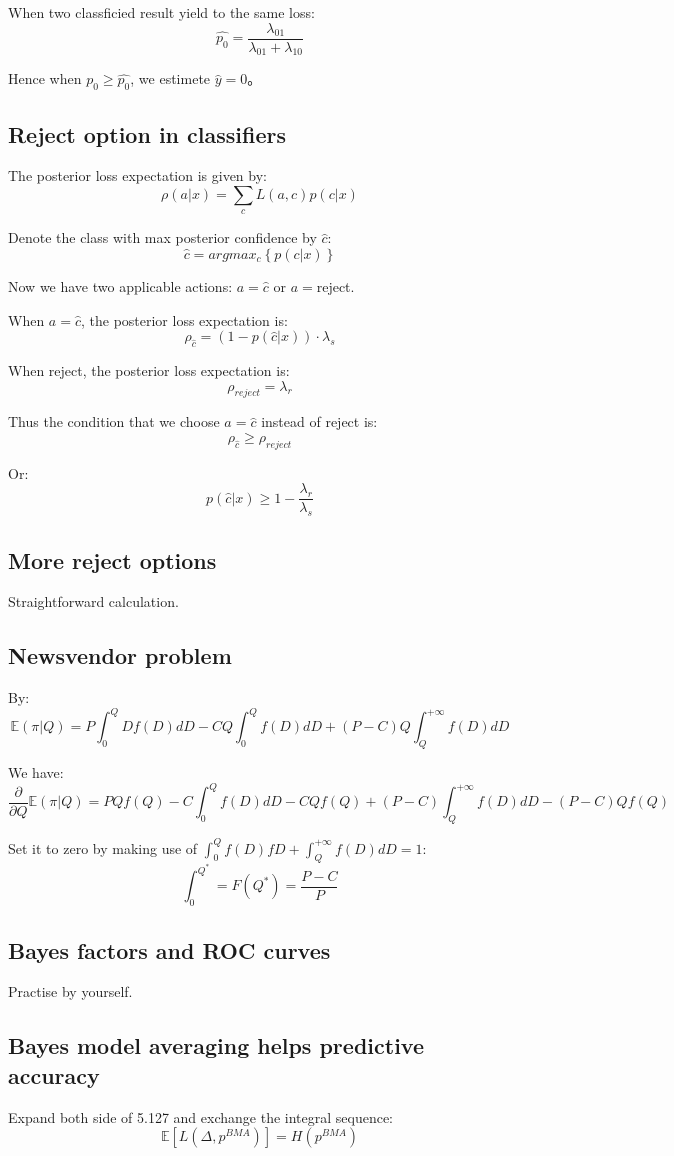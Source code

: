 \documentclass[UTF8]{ctexart}
\begin{document}
When two classficied result yield to the same loss:
$$\hat{p_{0}}=\frac{\lambda_{01}}{\lambda_{01}+\lambda_{10}}$$

Hence when $p_{0} \geq \hat{p_{0}}$, we estimete $\hat{y}=0$。

\subsection{Reject option in classifiers}
The posterior loss expectation is given by:
$$\rho(a|x)=\sum_{c}L(a,c)p(c|x)$$

Denote the class with max posterior confidence by $\hat{c}$:
$$\hat{c}=argmax_{c} \left\{p(c|x)\right\}$$

Now we have two applicable actions: $a=\hat{c}$ or $a=$reject.

When $a=\hat{c}$, the posterior loss expectation is:
$$\rho_{\hat{c}} = (1-p(\hat{c}|x))\cdot \lambda_{s}$$

When reject, the posterior loss expectation is:
$$\rho_{reject} = \lambda_{r}$$

Thus the condition that we choose $a=\hat{c}$ instead of reject is:
$$\rho_{\hat{c}} \geq \rho_{reject}$$

Or:
$$p(\hat{c}|x) \geq 1-\frac{\lambda_{r}}{\lambda_{s}}$$

\subsection{More reject options}
Straightforward calculation.

\subsection{Newsvendor problem}
By:
$$\mathbb{E}(\pi|Q)=P\int_{0}^{Q}Df(D)dD-CQ\int_{0}^{Q}f(D)dD+(P-C)Q\int_{Q}^{+\infty}f(D)dD$$

We have:
$$\frac{\partial}{\partial Q}\mathbb{E}(\pi|Q) = PQf(Q)-C\int_{0}^{Q}f(D)dD-CQf(Q)+(P-C)\int_{Q}^{+\infty}f(D)dD-(P-C)Qf(Q)$$

Set it to zero by making use of $\int_{0}^{Q}f(D)fD + \int_{Q}^{+\infty}f(D)dD=1$:
$$\int_{0}^{Q^{*}}=F(Q^{*})=\frac{P-C}{P}$$

\subsection{Bayes factors and ROC curves}
Practise by yourself.

\subsection{Bayes model averaging helps predictive accuracy}
Expand both side of 5.127 and exchange the integral sequence:
$$\mathbb{E}[L(\Delta,p^{BMA})]=H(p^{BMA})$$
\end{document}
